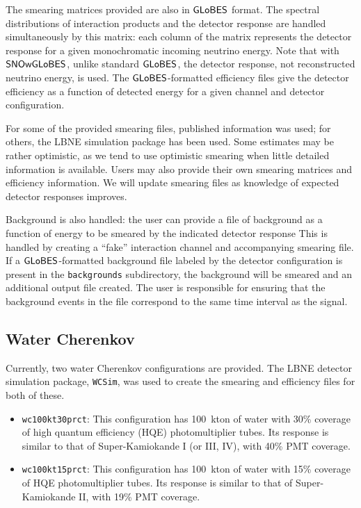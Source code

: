 \documentclass[12pt]{article}
\newcommand{\globes}{\sf{GLoBES}}
\newcommand{\snowglobes}{\sf{SNOwGLoBES}}
\begin{document}
The smearing matrices provided are also in $\globes$ format.  The
spectral distributions of interaction products and the detector
response are handled simultaneously by this matrix: each column of the
matrix represents the detector response for a given monochromatic
incoming neutrino energy.  Note that with $\snowglobes$, unlike standard $\globes$,
the detector response, not reconstructed neutrino energy, is used.
The $\globes$-formatted efficiency files give the
detector efficiency as a function of detected energy for a given channel and detector configuration.

For some of the provided smearing files, published information was
used; for others, the LBNE simulation package has been used.  Some
estimates may be rather optimistic, as we tend to use optimistic
smearing when little detailed information is available.  Users may
also provide their own smearing matrices and efficiency information.
We will update smearing files as knowledge of
expected detector responses improves.

Background is also handled: the user can provide a file of background as a function of energy to be smeared by the indicated detector response
This is handled by creating a ``fake'' interaction channel and accompanying smearing file.  If a $\globes$-formatted background file labeled by the detector configuration is present in the \texttt{backgrounds} subdirectory, the background will be smeared and an additional output file created.  The user is responsible for
ensuring that the background events in the file correspond to the same time interval as the signal.

\subsection{Water Cherenkov}

Currently, two water Cherenkov configurations are provided.  The LBNE
detector simulation package, \texttt{WCSim}, was used to create the
smearing and efficiency files for both of these.

\begin{itemize}

\item \texttt{wc100kt30prct}:
This configuration has 100~kton of water with 30\% coverage of high quantum efficiency (HQE) photomultiplier tubes.  Its response is similar to that of Super-Kamiokande I (or III, IV), with 40\% PMT coverage.

\item \texttt{wc100kt15prct}:
This configuration has 100~kton of water with 15\% coverage of HQE photomultiplier tubes.  Its response is similar to that of Super-Kamiokande II, with 19\% PMT coverage.


\end{itemize}
\end{document}
